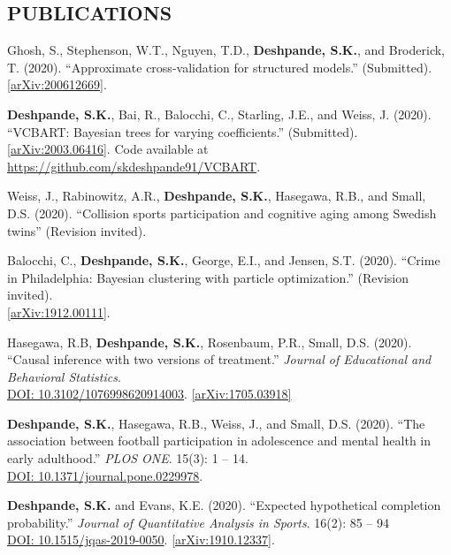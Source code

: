 \documentclass[margin]{res}
\begin{document}
\begin{resume}
\section{PUBLICATIONS}

Ghosh, S., Stephenson, W.T., Nguyen, T.D., \textbf{Deshpande, S.K.}, and Broderick, T. (2020). ``Approximate cross-validation for structured models.'' (Submitted). \\ \href{https://arxiv.org/abs/2006.12669}{[arXiv:200612669]}. 

\textbf{Deshpande, S.K.}, Bai, R., Balocchi, C., Starling, J.E., and Weiss, J. (2020). ``VCBART: Bayesian trees for varying coefficients.'' (Submitted). \\ \href{https://arxiv.org/abs/2003.06416}{[arXiv:2003.06416]}. Code available at \url{https://github.com/skdeshpande91/VCBART}.

Weiss, J., Rabinowitz, A.R., \textbf{Deshpande, S.K.}, Hasegawa, R.B., and Small, D.S. (2020). ``Collision sports participation and cognitive aging among Swedish twins'' (Revision invited).

Balocchi, C., \textbf{Deshpande, S.K.}, George, E.I., and Jensen, S.T. (2020). ``Crime in Philadelphia: Bayesian clustering with particle optimization.'' (Revision invited). \\ \href{https://arxiv.org/abs/1912.00111}{[arXiv:1912.00111]}.

Hasegawa, R.B, \textbf{Deshpande, S.K.}, Rosenbaum, P.R., Small, D.S. (2020). ``Causal inference with two versions of treatment.'' \textit{Journal of Educational and Behavioral Statistics}. \\ \href{https://doi.org/10.3102/1076998620914003}{DOI: 10.3102/1076998620914003}. \href{https://arxiv.org/abs/1705.03918}{[arXiv:1705.03918]}

\textbf{Deshpande, S.K.}, Hasegawa, R.B., Weiss, J., and Small, D.S. (2020). ``The association between football participation in adolescence and mental health in early adulthood.'' \textit{PLOS ONE}. 15(3): 1 -- 14. \\ \href{https://doi.org/10.1371/journal.pone.0229978}{DOI: 10.1371/journal.pone.0229978}.

\textbf{Deshpande, S.K.} and Evans, K.E. (2020). ``Expected hypothetical completion probability.'' \textit{Journal of Quantitative Analysis in Sports}. 16(2): 85 -- 94 \\ \href{https://doi.org/10.1515/jqas-2019-0050}{DOI: 10.1515/jqas-2019-0050}. \href{https://arxiv.org/abs/1910.12337}{[arXiv:1910.12337]}.


\end{resume}
\end{document}
